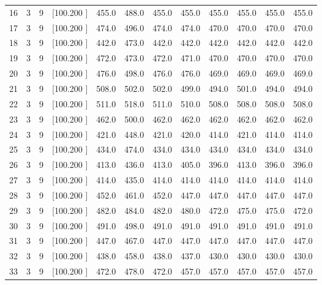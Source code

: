 \documentclass[12pt,a4paper]{article}
\begin{document}
\begin{center}
{\begin{tabular}{r r r r r r r r r r r r}
  16&  3&  9&[100.200   ]&   455.0&   488.0&   455.0&   455.0&   455.0&   455.0&   455.0&   455.0\\[-0.02in]
  17&  3&  9&[100.200   ]&   474.0&   496.0&   474.0&   474.0&   470.0&   470.0&   470.0&   470.0\\[-0.02in]
  18&  3&  9&[100.200   ]&   442.0&   473.0&   442.0&   442.0&   442.0&   442.0&   442.0&   442.0\\[-0.02in]
  19&  3&  9&[100.200   ]&   472.0&   473.0&   472.0&   471.0&   470.0&   470.0&   470.0&   470.0\\[-0.02in]
  20&  3&  9&[100.200   ]&   476.0&   498.0&   476.0&   476.0&   469.0&   469.0&   469.0&   469.0\\[-0.02in]
  21&  3&  9&[100.200   ]&   508.0&   502.0&   502.0&   499.0&   494.0&   501.0&   494.0&   494.0\\[-0.02in]
  22&  3&  9&[100.200   ]&   511.0&   518.0&   511.0&   510.0&   508.0&   508.0&   508.0&   508.0\\[-0.02in]
  23&  3&  9&[100.200   ]&   462.0&   500.0&   462.0&   462.0&   462.0&   462.0&   462.0&   462.0\\[-0.02in]
  24&  3&  9&[100.200   ]&   421.0&   448.0&   421.0&   420.0&   414.0&   421.0&   414.0&   414.0\\[-0.02in]
  25&  3&  9&[100.200   ]&   434.0&   474.0&   434.0&   434.0&   434.0&   434.0&   434.0&   434.0\\[-0.02in]
  26&  3&  9&[100.200   ]&   413.0&   436.0&   413.0&   405.0&   396.0&   413.0&   396.0&   396.0\\[-0.02in]
  27&  3&  9&[100.200   ]&   414.0&   435.0&   414.0&   414.0&   414.0&   414.0&   414.0&   414.0\\[-0.02in]
  28&  3&  9&[100.200   ]&   452.0&   461.0&   452.0&   447.0&   447.0&   447.0&   447.0&   447.0\\[-0.02in]
  29&  3&  9&[100.200   ]&   482.0&   484.0&   482.0&   480.0&   472.0&   475.0&   475.0&   472.0\\[-0.02in]
  30&  3&  9&[100.200   ]&   491.0&   498.0&   491.0&   491.0&   491.0&   491.0&   491.0&   491.0\\[-0.02in]
  31&  3&  9&[100.200   ]&   447.0&   467.0&   447.0&   447.0&   447.0&   447.0&   447.0&   447.0\\[-0.02in]
  32&  3&  9&[100.200   ]&   438.0&   458.0&   438.0&   437.0&   430.0&   430.0&   430.0&   430.0\\[-0.02in]
  33&  3&  9&[100.200   ]&   472.0&   478.0&   472.0&   457.0&   457.0&   457.0&   457.0&   457.0\\[-0.02in]

\end{tabular}}
\end{center}
\end{document}
